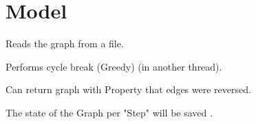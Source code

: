 \section{Model}

\begin{list}{-}{}
\item Reads the graph from a file.
\item Performs cycle break (Greedy) (in another thread).
\item Can return graph with Property that edges were reversed.
\item The state of the Graph per "Step" will be saved .

\end{list}


